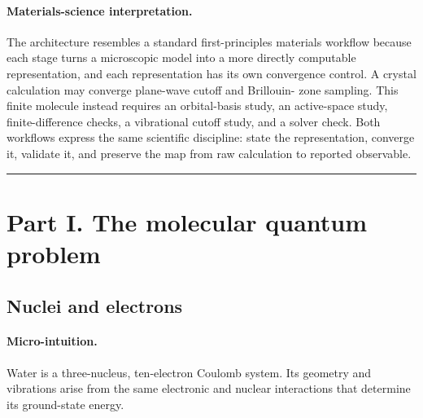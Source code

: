 \documentclass[10pt,twocolumn]{article}
\newcommand{\conceptbreak}{%
  \par\medskip\noindent
  {\color{black!30}\rule{\columnwidth}{0.35pt}}%
  \par\medskip}
\newcommand{\micro}{\paragraph{Micro-intuition.}}
\newcommand{\materials}{\paragraph{Materials-science interpretation.}}
\begin{document}
\begin{center}
\end{center}

\materials The architecture resembles a standard first-principles materials
workflow because each stage turns a microscopic model into a more directly
computable representation, and each representation has its own convergence
control.  A crystal calculation may converge plane-wave cutoff and Brillouin-
zone sampling.  This finite molecule instead requires an orbital-basis study,
an active-space study, finite-difference checks, a vibrational cutoff study,
and a solver check.  Both workflows express the same scientific discipline:
state the representation, converge it, validate it, and preserve the map from
raw calculation to reported observable.

\conceptbreak

\section*{Part I. The molecular quantum problem}

\subsection*{Nuclei and electrons}

\micro Water is a three-nucleus, ten-electron Coulomb system.  Its geometry
and vibrations arise from the same electronic and nuclear interactions that
determine its ground-state energy.
\end{document}
